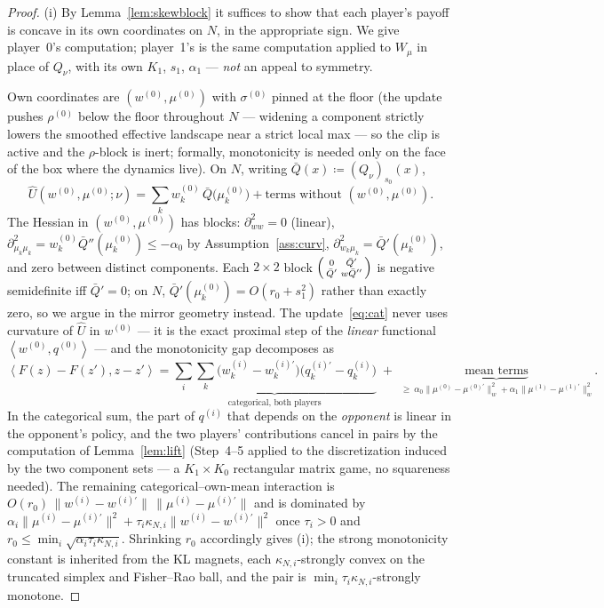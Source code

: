 \documentclass[11pt]{article}
\theoremstyle{definition}
\newcommand{\ip}[2]{\left\langle #1, #2 \right\rangle}
\begin{document}
\begin{proof}
(i) By Lemma~\ref{lem:skewblock} it suffices to show that each player's payoff
is concave in its own coordinates on $N$, in the appropriate sign. We give
player~0's computation; player~1's is the same computation applied to $W_\mu$
in place of $Q_\nu$, with its own $K_1$, $s_1$, $\alpha_1$ --- \emph{not} an
appeal to symmetry.

Own coordinates are $(w^{(0)}, \mu^{(0)})$ with $\sigma^{(0)}$ pinned at the
floor (the update pushes $\rho^{(0)}$ below the floor throughout $N$ ---
widening a component strictly lowers the smoothed effective landscape near a
strict local max --- so the clip is active and the $\rho$-block is inert;
formally, monotonicity is needed only on the face of the box where the
dynamics live). On $N$, writing $\bar Q(x) \coloneqq (Q_\nu)_{s_0}(x)$,
\[
  \widehat U(w^{(0)}, \mu^{(0)}; \nu)
  = \sum_k w^{(0)}_k\, \bar Q\big(\mu^{(0)}_k\big)
  + \text{terms without } (w^{(0)}, \mu^{(0)}).
\]
The Hessian in $(w^{(0)}, \mu^{(0)})$ has blocks: $\partial^2_{ww} = 0$
(linear), $\partial^2_{\mu_k \mu_k} = w^{(0)}_k \bar Q''(\mu^{(0)}_k) \le
-\alpha_0$ by Assumption~\ref{ass:curv}, $\partial^2_{w_k \mu_k} =
\bar Q'(\mu^{(0)}_k)$, and zero between distinct components. Each
$2 \times 2$ block
$\begin{psmallmatrix} 0 & \bar Q' \\ \bar Q' & w \bar Q'' \end{psmallmatrix}$
is negative semidefinite iff $\bar Q' = 0$; on $N$,
$\bar Q'(\mu^{(0)}_k) = O(r_0 + s_1^2)$ rather than exactly zero, so we argue
in the mirror geometry instead. The update~\eqref{eq:cat} never uses curvature
of $\widehat U$ in $w^{(0)}$ --- it is the exact proximal step of the
\emph{linear} functional $\ip{w^{(0)}}{q^{(0)}}$ --- and the monotonicity gap
decomposes as
\[
  \ip{F(z) - F(z')}{z - z'} =
  \underbrace{\textstyle\sum_i \sum_k
  \big(w^{(i)}_k - w^{(i)\prime}_k\big)\big(q^{(i)\prime}_k - q^{(i)}_k\big)}
  _{\text{categorical, both players}}
  \;+\; \underbrace{\text{mean terms}}
  _{\ \ge\ \alpha_0 \|\mu^{(0)} - \mu^{(0)\prime}\|^2_{w}
    + \alpha_1 \|\mu^{(1)} - \mu^{(1)\prime}\|^2_{w}} .
\]
In the categorical sum, the part of $q^{(i)}$ that depends on the
\emph{opponent} is linear in the opponent's policy, and the two players'
contributions cancel in pairs by the computation of Lemma~\ref{lem:lift}
(Step~4--5 applied to the discretization induced by the two component sets ---
a $K_1 \times K_0$ rectangular matrix game, no squareness needed). The
remaining categorical--own-mean interaction is
$O(r_0)\,\|w^{(i)} - w^{(i)\prime}\|\,\|\mu^{(i)} - \mu^{(i)\prime}\|$ and is
dominated by $\alpha_i\|\mu^{(i)}-\mu^{(i)\prime}\|^2 +
\tau_i \kappa_{N,i}\|w^{(i)}-w^{(i)\prime}\|^2$ once $\tau_i > 0$ and
$r_0 \le \min_i \sqrt{\alpha_i \tau_i \kappa_{N,i}}$. Shrinking $r_0$
accordingly gives (i); the strong monotonicity constant is inherited from the
KL magnets, each $\kappa_{N,i}$-strongly convex on the truncated simplex and
Fisher--Rao ball, and the pair is $\min_i \tau_i \kappa_{N,i}$-strongly
monotone.


\end{proof}
\end{document}
